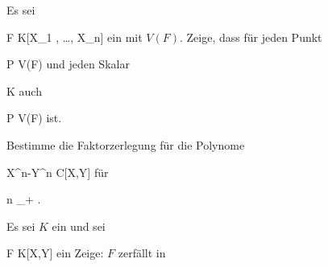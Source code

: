 \setcounter{section}{5}







{}
{





Es sei

\mavergleichskette
{\vergleichskette
{ F
}
{ \in }{ K[X_1 , \ldots ,  X_n]
}
{  }{
}
{    }{
}
{   }{
}
}
{}{}{}
ein
mit
$V(F)$. Zeige, dass für jeden Punkt

\mavergleichskette
{\vergleichskette
{ P
}
{ \in }{ V(F)
}
{  }{
}
{    }{
}
{   }{
}
}
{}{}{}
und jeden Skalar

\mavergleichskette
{\vergleichskette
{ \lambda
}
{ \in }{ K
}
{  }{
}
{    }{
}
{   }{
}
}
{}{}{}
auch

\mavergleichskette
{\vergleichskette
{ \lambda P
}
{ \in }{ V(F)
}
{  }{
}
{    }{
}
{   }{
}
}
{}{}{}
ist.





}
{} {}

{}
{





Bestimme die Faktorzerlegung für die Polynome

\mavergleichskettedisp
{\vergleichskette
{ X^n-Y^n
}
{ \in} { {\mathbb C}[X,Y]
}
{ } {
}
{ } {
}
{ } {
}
}
{}{}{}
für

\mavergleichskette
{\vergleichskette
{ n
}
{ \in }{ \N_+
}
{  }{
}
{    }{
}
{   }{
}
}
{}{}{.}





}
{} {}

{}
{





Es sei $K$ ein
und sei

\mavergleichskette
{\vergleichskette
{F
}
{ \in }{ K[X,Y]
}
{  }{
}
{    }{
}
{   }{
}
}
{}{}{}
ein
Zeige: $F$ zerfällt in





}
{} {}


